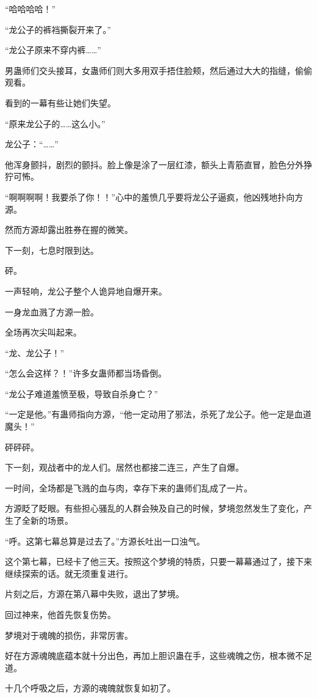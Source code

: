 \begin{this_body}
“哈哈哈哈！”

“龙公子的裤裆撕裂开来了。”

“龙公子原来不穿内裤……”

男蛊师们交头接耳，女蛊师们则大多用双手捂住脸颊，然后通过大大的指缝，偷偷观看。

看到的一幕有些让她们失望。

“原来龙公子的……这么小。”

龙公子：“……”

他浑身颤抖，剧烈的颤抖。脸上像是涂了一层红漆，额头上青筋直冒，脸色分外狰狞可怖。

“啊啊啊啊！我要杀了你！！”心中的羞愤几乎要将龙公子逼疯，他凶残地扑向方源。

然而方源却露出胜券在握的微笑。

下一刻，七息时限到达。

砰。

一声轻响，龙公子整个人诡异地自爆开来。

一身龙血溅了方源一脸。

全场再次尖叫起来。

“龙、龙公子！”

“怎么会这样？！”许多女蛊师都当场昏倒。

“龙公子难道羞愤至极，导致自杀身亡？”

“一定是他。”有蛊师指向方源，“他一定动用了邪法，杀死了龙公子。他一定是血道魔头！”

砰砰砰。

下一刻，观战者中的龙人们。居然也都接二连三，产生了自爆。

一时间，全场都是飞溅的血与肉，幸存下来的蛊师们乱成了一片。

方源眨了眨眼。有些担心骚乱的人群会殃及自己的时候，梦境忽然发生了变化，产生了全新的场景。

“呼。这第七幕总算是过去了。”方源长吐出一口浊气。

这个第七幕，已经卡了他三天。按照这个梦境的特质，只要一幕幕通过了，接下来继续探索的话。就无须重复进行。

片刻之后，方源在第八幕中失败，退出了梦境。

回过神来，他首先恢复伤势。

梦境对于魂魄的损伤，非常厉害。

好在方源魂魄底蕴本就十分出色，再加上胆识蛊在手，这些魂魄之伤，根本微不足道。

十几个呼吸之后，方源的魂魄就恢复如初了。


\end{this_body}
